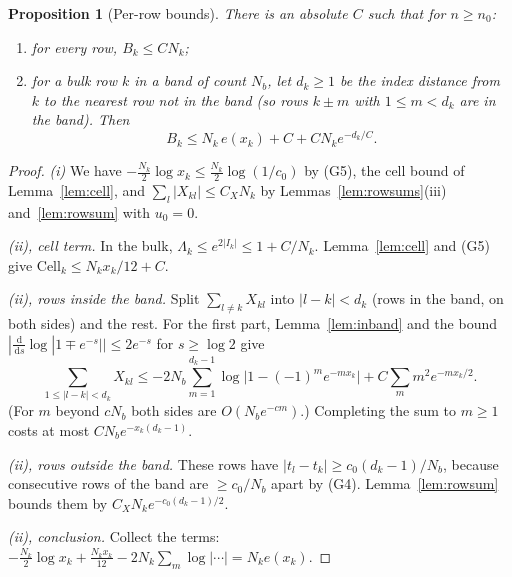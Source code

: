 \documentclass[11pt]{article}
\newtheorem{proposition}[theorem]{Proposition}
\theoremstyle{definition}
\theoremstyle{remark}
\newcommand{\dd}{\,\mathrm d}
\begin{document}
\begin{proposition}[Per-row bounds]\label{prop:perrow}
There is an absolute $C$ such that for $n\ge n_0$:
\begin{enumerate}[label=(\roman*)]
\item for every row, $B_k\le CN_k$;
\item for a bulk row $k$ in a band of count $N_b$, let $d_k\ge1$ be the index distance from $k$ to
  the nearest row not in the band (so rows $k\pm m$ with $1\le m<d_k$ are in the band). Then
  \[
  B_k\le N_k\,e(x_k)+C+CN_ke^{-d_k/C}.
  \]
\end{enumerate}
\end{proposition}
\begin{proof}
\emph{(i)} We have $-\tfrac{N_k}{2}\log x_k\le\tfrac{N_k}2\log(1/c_0)$ by (G5), the cell bound of
Lemma~\ref{lem:cell}, and $\sum_l|X_{kl}|\le C_XN_k$ by Lemmas~\ref{lem:rowsums}(iii)
and~\ref{lem:rowsum} with $u_0=0$.

\emph{(ii), cell term.} In the bulk, $\Lambda_k\le e^{2|I_k|}\le1+C/N_k$. Lemma~\ref{lem:cell} and
(G5) give $\mathrm{Cell}_k\le N_kx_k/12+C$.

\emph{(ii), rows inside the band.} Split $\sum_{l\ne k}X_{kl}$ into $|l-k|<d_k$ (rows in the
band, on both sides) and the rest. For the first part, Lemma~\ref{lem:inband} and the bound
$|\frac{\dd}{\dd s}\log|1\mp e^{-s}||\le2e^{-s}$ for $s\ge\log2$ give
\[
\sum_{1\le|l-k|<d_k}X_{kl}\le-2N_b\sum_{m=1}^{d_k-1}\log\bigl|1-(-1)^me^{-mx_k}\bigr|+C\sum_mm^2e^{-mx_k/2}.
\]
(For $m$ beyond $cN_b$ both sides are $O(N_be^{-cm})$.) Completing the sum to $m\ge1$ costs at
most $CN_be^{-x_k(d_k-1)}$.

\emph{(ii), rows outside the band.} These rows have $|t_l-t_k|\ge c_0(d_k-1)/N_b$, because
consecutive rows of the band are $\ge c_0/N_b$ apart by (G4). Lemma~\ref{lem:rowsum} bounds them by
$C_XN_ke^{-c_0(d_k-1)/2}$.

\emph{(ii), conclusion.} Collect the terms:
$-\tfrac{N_k}2\log x_k+\tfrac{N_kx_k}{12}-2N_k\sum_m\log|\cdots|=N_ke(x_k)$.
\end{proof}
\end{document}
